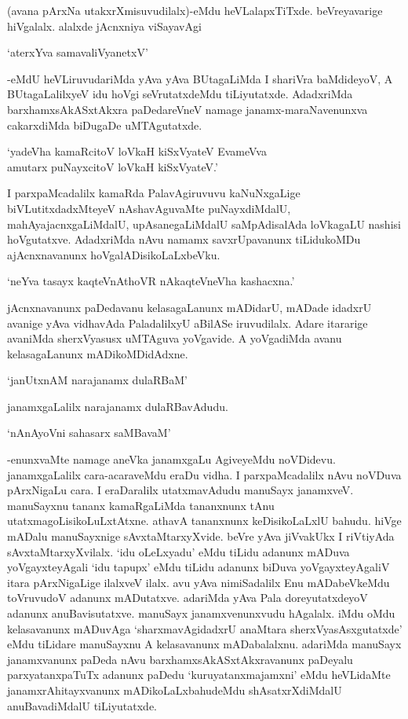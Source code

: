 (avana pArxNa utakxrXmisuvudilalx)-eMdu heVLalapxTiTxde. beVreyavarige hiVgalalx. alalxde jAcnxniya viSayavAgi

\begin{shloka}
`aterxYva samavaliVyanetxV'
\end{shloka}

-eMdU heVLiruvudariMda yAva yAva BUtagaLiMda I shariVra baMdideyoV, A BUtagaLalilxyeV idu hoVgi seVrutatxdeMdu tiLiyutatxde. AdadxriMda barxhamxsAkASxtAkxra paDedareVneV namage janamx-maraNavenunxva cakarxdiMda biDugaDe uMTAgutatxde.

\begin{shloka}
`yadeVha kamaRcitoV loVkaH kiSxVyateV EvameVva\\
amutarx puNayxcitoV loVkaH kiSxVyateV.'
\end{shloka}

I parxpaMcadalilx kamaRda PalavAgiruvuvu kaNuNxgaLige biVLutitxdadxMteyeV nAshavAguvaMte puNayxdiMdalU, mahAyajacnxgaLiMdalU, upAsanegaLiMdalU saMpAdisalAda loVkagaLU nashisi hoVgutatxve. AdadxriMda nAvu namamx savxrUpavanunx tiLidukoMDu ajAcnxnavanunx hoVgalADisikoLaLxbeVku.

\begin{shloka}
`neYva tasayx kaqteVnAthoVR nAkaqteVneVha kashacxna.'
\end{shloka}

jAcnxnavanunx paDedavanu kelasagaLanunx mADidarU, mADade idadxrU avanige yAva vidhavAda PaladalilxyU aBilASe iruvudilalx. Adare itararige avaniMda sherxVyasusx uMTAguva yoVgavide. A yoVgadiMda avanu kelasagaLanunx mADikoMDidAdxne.

\begin{shloka}
`janUtxnAM narajanamx dulaRBaM'
\end{shloka}

janamxgaLalilx narajanamx dulaRBavAdudu.

\begin{shloka}
`nAnAyoVni sahasarx saMBavaM'
\end{shloka}

-enunxvaMte namage aneVka janamxgaLu AgiveyeMdu noVDidevu. janamxgaLalilx cara-acaraveMdu eraDu vidha. I parxpaMcadalilx nAvu noVDuva pArxNigaLu cara. I eraDaralilx utatxmavAdudu manuSayx janamxveV. manuSayxnu tananx kamaRgaLiMda tananxnunx tAnu utatxmagoLisikoLuLxtAtxne. athavA tananxnunx keDisikoLaLxlU bahudu. hiVge mADalu manuSayxnige sAvxtaMtarxyXvide. beVre yAva jiVvakUkx I riVtiyAda sAvxtaMtarxyXvilalx. `idu oLeLxyadu' eMdu tiLidu adanunx mADuva yoVgayxteyAgali `idu tapupx' eMdu tiLidu adanunx biDuva yoVgayxteyAgaliV itara pArxNigaLige ilalxveV ilalx. avu yAva nimiSadalilx Enu mADabeVkeMdu toVruvudoV adanunx mADutatxve. adariMda yAva Pala doreyutatxdeyoV adanunx anuBavisutatxve. manuSayx janamxvenunxvudu hAgalalx. iMdu oMdu kelasavanunx mADuvAga `sharxmavAgidadxrU anaMtara sherxVyasAsxgutatxde' eMdu tiLidare manuSayxnu A kelasavanunx mADabalalxnu. adariMda manuSayx janamxvanunx  paDeda nAvu barxhamxsAkASxtAkxravanunx paDeyalu parxyatanxpaTuTx adanunx paDedu `kuruyatanxmajamxni' eMdu heVLidaMte janamxrAhitayxvanunx mADikoLaLxbahudeMdu shAsatxrXdiMdalU anuBavadiMdalU tiLiyutatxde.

